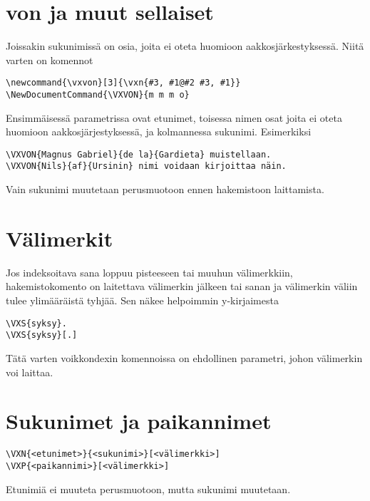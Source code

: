 \documentclass[12pt]{article}
\begin{document}
\section*{von ja muut sellaiset}

Joissakin sukunimissä on osia, joita ei oteta huomioon
aakkosjärkestyksessä. Niitä varten on komennot

\begin{verbatim}
\newcommand{\vxvon}[3]{\vxn{#3, #1@#2 #3, #1}}
\NewDocumentCommand{\VXVON}{m m m o}
\end{verbatim}

Ensimmäisessä parametrissa ovat etunimet, toisessa nimen osat joita
ei oteta huomioon aakkosjärjestyksessä, ja kolmannessa sukunimi.
Esimerkiksi

\begin{verbatim}
\VXVON{Magnus Gabriel}{de la}{Gardieta} muistellaan.
\VXVON{Nils}{af}{Ursinin} nimi voidaan kirjoittaa näin.
\end{verbatim}

Vain sukunimi muutetaan perusmuotoon ennen hakemistoon laittamista.


\section*{Välimerkit}


Jos indeksoitava sana loppuu pisteeseen tai muuhun välimerkkiin,
hakemistokomento on laitettava välimerkin jälkeen tai sanan ja
välimerkin väliin tulee ylimääräistä tyhjää. Sen näkee helpoimmin
y-kirjaimesta

\begin{verbatim}
\VXS{syksy}.
\VXS{syksy}[.]
\end{verbatim}


Tätä varten voikkondexin komennoissa on ehdollinen parametri, johon
välimerkin voi laittaa.


\section*{Sukunimet ja paikannimet}

\begin{verbatim}
\VXN{<etunimet>}{<sukunimi>}[<välimerkki>]
\VXP{<paikannimi>}[<välimerkki>]
\end{verbatim}

Etunimiä ei muuteta perusmuotoon, mutta sukunimi muutetaan.
\end{document}
